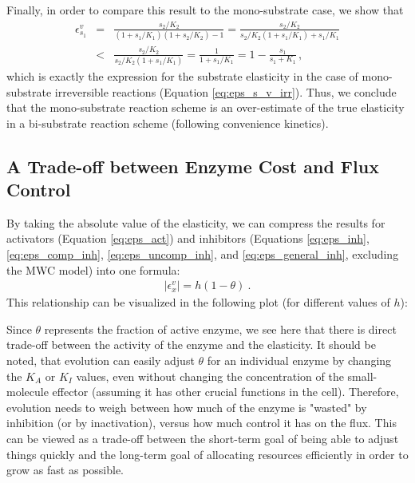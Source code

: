 \documentclass[12pt,a4paper]{article}
\begin{document}
Finally, in order to compare this result to the mono-substrate case, we show that
\begin{eqnarray}
\epsilon^{v}_{s_1} &=& \frac{s_2/K_2}{(1 + s_1/K_1) (1 + s_2 / K_2) - 1} = 
\frac{s_2/K_2}{s_2 / K_2 (1 + s_1/K_1)  + s_1/K_1} \nonumber\\
&<& \frac{s_2/K_2}{s_2 / K_2 (1 + s_1/K_1)} = \frac{1}{1 + s_1/K_1} = 1 - \frac{s_1}{s_1 + K_1}\,,
\end{eqnarray}
which is exactly the expression for the substrate elasticity in the case of mono-substrate irreversible reactions (Equation \ref{eq:eps_s_v_irr}). Thus, we conclude that the mono-substrate reaction scheme is an over-estimate of the true elasticity in a bi-substrate reaction scheme (following convenience kinetics).

\subsection{A Trade-off between Enzyme Cost and Flux Control}
By taking the absolute value of the elasticity, we can compress the results for activators (Equation \ref{eq:eps_act}) and inhibitors (Equations \ref{eq:eps_inh}, \ref{eq:eps_comp_inh}, \ref{eq:eps_uncomp_inh}, and \ref{eq:eps_general_inh}, excluding the MWC model) into one formula:
\begin{eqnarray}
|\epsilon_x^v| = h (1 - \theta)~. \label{eq:abs_elast}
\end{eqnarray}
This relationship can be visualized in the following plot (for different values of $h$):
\begin{center}
\end{center}

Since $\theta$ represents the fraction of active enzyme, we see here that there is direct trade-off between the activity of the enzyme and the elasticity. It should be noted, that evolution can easily adjust $\theta$ for an individual enzyme by changing the $K_A$ or $K_I$ values, even without changing the concentration of the small-molecule effector (assuming it has other crucial functions in the cell). Therefore, evolution needs to weigh between how much of the enzyme is "wasted" by inhibition (or by inactivation), versus how much control it has on the flux. This can be viewed as a trade-off between the short-term goal of being able to adjust things quickly and the long-term goal of allocating resources efficiently in order to grow as fast as possible.
\end{document}
